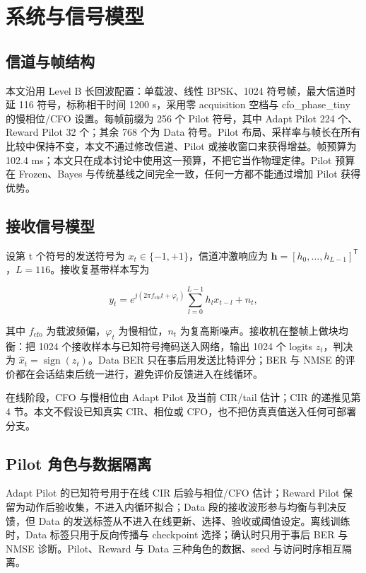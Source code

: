 \section{系统与信号模型}

\subsection{信道与帧结构}

本文沿用 Level B 长回波配置：单载波、线性 BPSK、1024 符号帧，最大信道时延 116 符号，标称相干时间 1200 s，采用零 acquisition 空档与 cfo\_phase\_tiny 的慢相位/CFO 设置。每帧前缀为 256 个 Pilot 符号，其中 Adapt Pilot 224 个、Reward Pilot 32 个；其余 768 个为 Data 符号。Pilot 布局、采样率与帧长在所有比较中保持不变，本文不通过修改信道、Pilot 或接收窗口来获得增益。帧预算为 102.4 ms；本文只在成本讨论中使用这一预算，不把它当作物理定律。Pilot 预算在 Frozen、Bayes 与传统基线之间完全一致，任何一方都不能通过增加 Pilot 获得优势。

\subsection{接收信号模型}

设第 t 个符号的发送符号为 $x_t \in \{-1,+1\}$，信道冲激响应为 $\mathbf{h}=[h_0,\ldots,h_{L-1}]^{\mathsf T}$，$L=116$。接收复基带样本写为

\begin{equation*}
y_t = e^{j(2\pi f_{\mathrm{cfo}} t+\varphi_t)}\sum_{l=0}^{L-1} h_l x_{t-l}+n_t,
\end{equation*}

其中 $f_{\mathrm{cfo}}$ 为载波频偏，$\varphi_t$ 为慢相位，$n_t$ 为复高斯噪声。接收机在整帧上做块均衡：把 1024 个接收样本与已知符号掩码送入网络，输出 1024 个 logits $z_t$，判决为 $\hat{x}_t=\operatorname{sign}(z_t)$。Data BER 只在事后用发送比特评分；BER 与 NMSE 的评价都在会话结束后统一进行，避免评价反馈进入在线循环。

在线阶段，CFO 与慢相位由 Adapt Pilot 及当前 CIR/tail 估计；CIR 的递推见第 4 节。本文不假设已知真实 CIR、相位或 CFO，也不把仿真真值送入任何可部署分支。

\subsection{Pilot 角色与数据隔离}

Adapt Pilot 的已知符号用于在线 CIR 后验与相位/CFO 估计；Reward Pilot 保留为动作后验收集，不进入内循环拟合；Data 段的接收波形参与均衡与判决反馈，但 Data 的发送标签从不进入在线更新、选择、验收或阈值设定。离线训练时，Data 标签只用于反向传播与 checkpoint 选择；确认时只用于事后 BER 与 NMSE 诊断。Pilot、Reward 与 Data 三种角色的数据、seed 与访问时序相互隔离。
